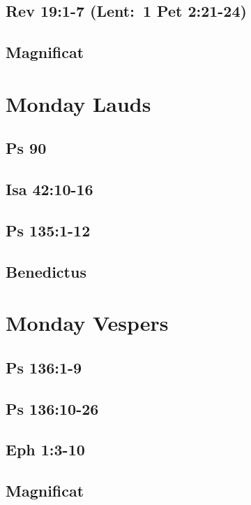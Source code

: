 \subsection{Rev 19:1-7 (Lent: 1 Pet 2:21-24)}

\subsection{Magnificat}


\section{Monday Lauds}

\subsection{Ps 90}

\subsection{Isa 42:10-16}

\subsection{Ps 135:1-12}

\subsection{Benedictus}


\section{Monday Vespers}

\subsection{Ps 136:1-9}

\subsection{Ps 136:10-26}

\subsection{Eph 1:3-10}

\subsection{Magnificat}


